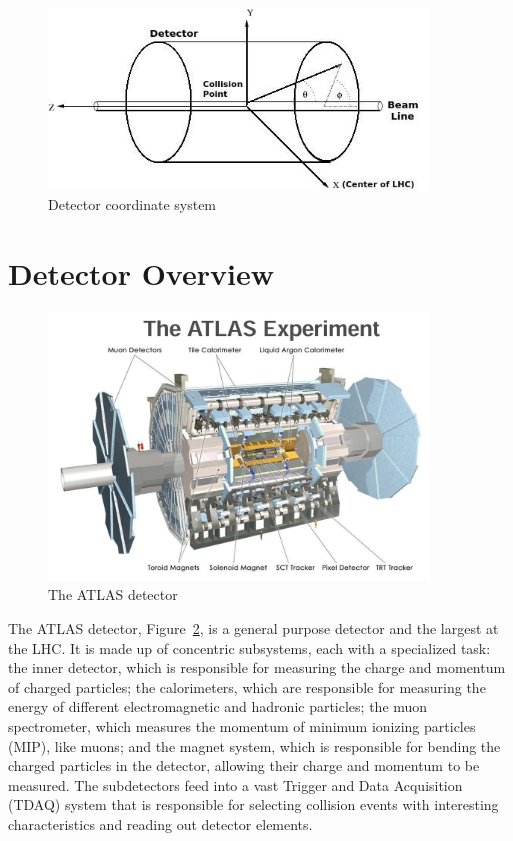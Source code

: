 \begin{figure}[h]
\begin{center}
\includegraphics*[width=0.90\textwidth] {figures/coordinate}
\caption[Detector coordinate system]{Detector coordinate system \cite{phdthesis}}
\label{fig:coord}
\end{center}
\end{figure}

\newpage

\section{Detector Overview}
\begin{figure}[h]
\begin{center}
\includegraphics*[width=0.90\textwidth] {figures/ATLAS_det}
\caption[The ATLAS detector]{The ATLAS detector \cite{Collaboration_2008}}
\label{fig:ATLAS_det}
\end{center}
\end{figure}
\newpage
The ATLAS detector, Figure~\ref{fig:ATLAS_det}, is a general purpose detector and the largest at the LHC.  It is made up of concentric subsystems, each with a specialized task: the inner detector, which is responsible for measuring the charge and momentum of charged particles; the calorimeters, which are responsible for measuring the energy of different electromagnetic and hadronic particles; the muon spectrometer, which measures the momentum of minimum ionizing particles (MIP), like muons; and the magnet system, which is responsible for bending the charged particles in the detector, allowing their charge and momentum to be measured. The subdetectors feed into a vast Trigger and Data Acquisition (TDAQ) system that is responsible for selecting collision events with interesting characteristics and reading out detector elements.
%
